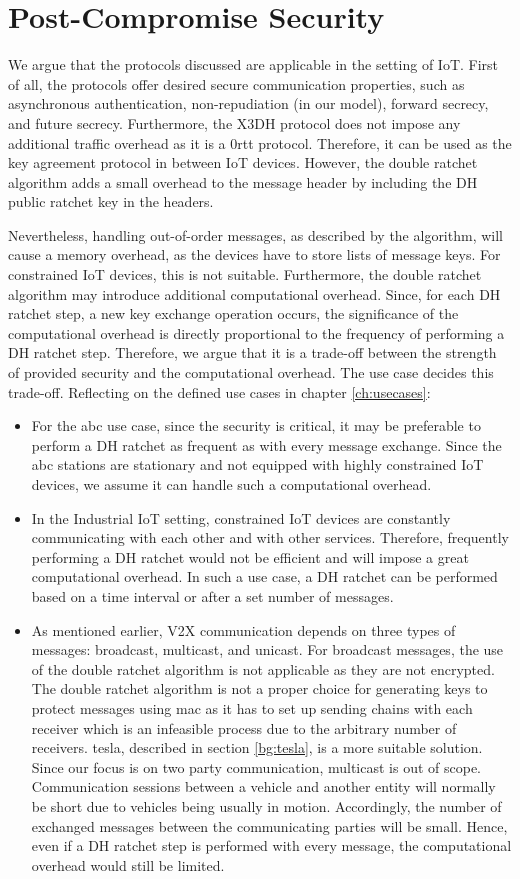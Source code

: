 \section{Post-Compromise Security}
We argue that the protocols discussed are applicable in the setting of IoT.
First of all, the protocols offer desired secure communication properties, such as asynchronous authentication, non-repudiation (in our model), forward secrecy, and future secrecy.
Furthermore, the X3DH protocol does not impose any additional traffic overhead as it is a \gls{0rtt} protocol. Therefore, it can be used as the key agreement protocol in between IoT devices. However, the double ratchet algorithm adds a small overhead to the message header by including the DH public ratchet key in the headers.
\par
Nevertheless, handling out-of-order messages, as described by the algorithm, will cause a memory overhead, as the devices have to store lists of message keys. For constrained IoT devices, this is not suitable.
Furthermore, the double ratchet algorithm may introduce additional computational overhead. Since, for each DH ratchet step, a new key exchange operation occurs, the significance of the computational overhead is directly proportional to the frequency of performing a DH ratchet step. Therefore, we argue that it is a trade-off between the strength of provided security and the computational overhead. The use case decides this trade-off.
Reflecting on the defined use cases in chapter \ref{ch:usecases}:
\begin{itemize}
	\item For the \gls{abc} use case, since the security is critical, it may be preferable to perform a DH ratchet as frequent as with every message exchange. Since the \gls{abc} stations are stationary and not equipped with highly constrained IoT devices, we assume it can handle such a computational overhead.
	\item In the Industrial IoT setting, constrained IoT devices are constantly communicating with each other and with other services. Therefore, frequently performing a DH ratchet would not be efficient and will impose a great computational overhead. In such a use case, a DH ratchet can be performed based on a time interval or after a set number of messages.
	\item As mentioned earlier, V2X communication depends on three types of messages: broadcast, multicast, and unicast. For broadcast messages, the use of the double ratchet algorithm is not applicable as they are not encrypted. The double ratchet algorithm is not a proper choice for generating keys to protect messages using \gls{mac} as it has to set up sending chains with each receiver which is an infeasible process due to the arbitrary number of receivers. \gls{tesla}, described in section \ref{bg:tesla}, is a more suitable solution. Since our focus is on two party communication, multicast is out of scope. 
	Communication sessions between a vehicle and another entity will normally be short due to vehicles being usually in motion. Accordingly, the number of exchanged messages between the communicating parties will be small. Hence, even if a DH ratchet step is performed with every message, the computational overhead would still be limited.
\end{itemize}
